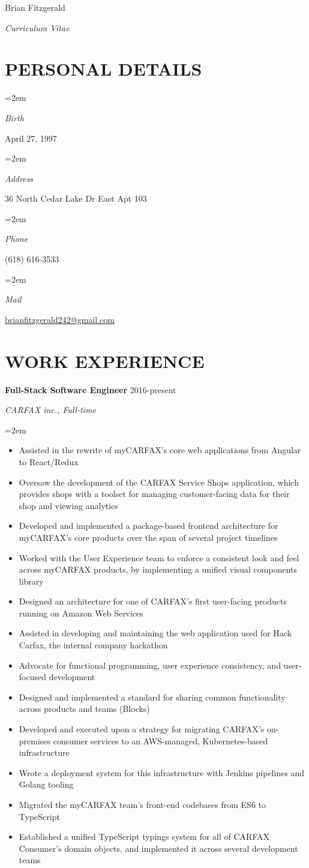 \documentclass[paper=a4,fontsize=11pt]{scrartcl} %
\newlength{\spacebox}
\newcommand{\sepspace}{\vspace*{1em}}		%
\newcommand{\MyName}[1]{ %
			\Huge \usefont{OT1}{phv}{b}{n} \hfill #1
			\par \normalsize \normalfont}
\newcommand{\MySlogan}[1]{ %
			\large \usefont{OT1}{phv}{m}{n}\hfill \textit{#1}
			\par \normalsize \normalfont}
\newcommand{\NewPart}[1]{\section*{\uppercase{#1}}}
\newcommand{\PersonalEntry}[2]{
			\noindent\hangindent=2em\hangafter=0 %
			\parbox{\spacebox}{        %
			\textit{#1}}		       %
			\hspace{1.5em} #2 \par}    %
\newcommand{\EducationEntry}[4]{
			\noindent \textbf{#1} \hfill      %
			\colorbox{Black}{%
				\parbox{6em}{%
				\hfill\color{White}#2}} \par  %
			\noindent \textit{#3} \par        %
			\noindent\hangindent=2em\hangafter=0 \small #4 %
			\normalsize \par}
\newcommand{\WorkEntry}[4]{				  %
			\noindent \textbf{#1} \hfill      %
			\colorbox{White}{\color{Black}#2} \par  %
			\noindent \textit{#3} \par              %
			\noindent\hangindent=2em\hangafter=0 \small #4 %
			\normalsize \par}
\begin{document}
	
	\MyName{Brian Fitzgerald}
	\MySlogan{Curriculum Vitae}
	
	\sepspace
	
	\NewPart{Personal details}{}
	
	\PersonalEntry{Birth}{April 27, 1997}
	\PersonalEntry{Address}{36 North Cedar Lake Dr East Apt 103}
	\PersonalEntry{Phone}{(618) 616-3533}
	\PersonalEntry{Mail}{\url{brianfitzgerald242@gmail.com}}
	
	\NewPart{Work experience}{}
	
	\WorkEntry{Full-Stack Software Engineer}{2016-present}{CARFAX inc., Full-time}{
		\begin{itemize}
			\item Assisted in the rewrite of myCARFAX's core web applications from Angular to React/Redux
			\item Oversaw the development of the CARFAX Service Shops application, which provides shops with a toolset for managing customer-facing data for their shop and viewing analytics
			\item Developed and implemented a package-based frontend architecture for myCARFAX's core products over the span of several project timelines
			\item Worked with the User Experience team to enforce a consistent look and feel across myCARFAX products, by implementing a unified visual components library
			\item Designed an architecture for one of CARFAX's first user-facing products running on Amazon Web Services
			\item Assisted in developing and maintaining the web application used for Hack Carfax, the internal company hackathon
			\item Advocate for functional programming, user experience consistency, and user-focused development
			\item Designed and implemented a standard for sharing common functionality across products and teams (Blocks)
			\item Developed and executed upon a strategy for migrating CARFAX's on-premises consumer services to an AWS-managed, Kubernetes-based infrastructure
			\item Wrote a deployment system for this infrastructure with Jenkins pipelines and Golang tooling
			\item Migrated the myCARFAX team's front-end codebases from ES6 to TypeScript
			\item Established a unified TypeScript typings system for all of CARFAX Consumer's domain objects, and implemented it across several development teams
		\end{itemize}
	}
	\sepspace
	
\end{document}
